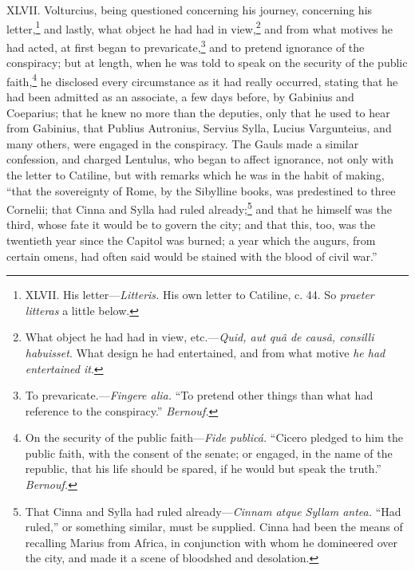 XLVII. Volturcius, being questioned concerning his journey, concerning
his letter,\footnote{XLVII. His letter—\emph{Litteris.} His own letter to Catiline, c. 44.
So \emph{praeter litteras} a little below.} and lastly, what object he had had in view,\footnote{What object he had had in view, etc.—\emph{Quid, aut quâ de causâ,
consilli habuisset}. What design he had entertained, and from what
motive \emph{he had entertained it}.} and
from what motives he had acted, at first began to prevaricate,\footnote{To prevaricate.—\emph{Fingere alia.} ``To pretend other things
than what had reference to the conspiracy.'' \emph{Bernouf.}}
and to pretend ignorance of the conspiracy; but at length, when he was
told to speak on the security of the public faith,\footnote{On the security of the public faith—\emph{Fide publicá.}
``Cicero pledged to him the public faith, with the consent of the
senate; or engaged, in the name of the republic, that his life
should be spared, if he would but speak the truth.'' \emph{Bernouf.}} he disclosed
every circumstance as it had really occurred, stating that he had been
admitted as an associate, a few days before, by Gabinius and Coeparius;
that he knew no more than the deputies, only that he used to hear from
Gabinius, that Publius Autronius, Servius Sylla, Lucius Vargunteius,
and many others, were engaged in the conspiracy. The Gauls made a
similar confession, and charged Lentulus, who began to affect ignorance,
not only with the letter to Catiline, but with remarks which he was in
the habit of making, ``that the sovereignty of Rome, by the Sibylline
books, was predestined to three Cornelii; that Cinna and Sylla had ruled
already;\footnote{That Cinna and Sylla had ruled already—\emph{Cinnam atque Syllam
antea.} ``Had ruled,'' or something similar, must be supplied. Cinna
had been the means of recalling Marius from Africa, in conjunction
with whom he domineered over the city, and made it a scene of
bloodshed and desolation.} and that he himself was the third, whose fate it would be
to govern the city; and that this, too, was the twentieth year since the
Capitol was burned; a year which the augurs, from certain omens, had
often said would be stained with the blood of civil war.''

